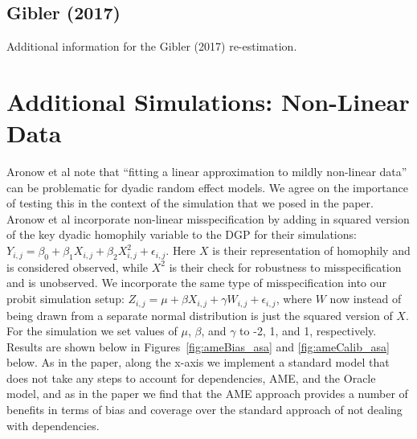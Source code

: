 \documentclass[12pt]{amsart}
\begin{document}
\subsection*{Gibler (2017)}

Additional information for the Gibler (2017) re-estimation.


\FloatBarrier

\FloatBarrier
\clearpage


\section{Additional Simulations: Non-Linear Data}

Aronow et al note that ``fitting a linear approximation to mildly non-linear data'' can be problematic for dyadic random effect models. We agree on the importance of testing this in the context of the simulation that we posed in the paper. Aronow et al incorporate non-linear misspecification by adding in squared version of the key dyadic homophily variable to the DGP for their simulations: $Y_{i,j} = \beta_{0} + \beta_{1} X_{i,j} + \beta_{2} X_{i,j}^{2} + \epsilon_{i,j}$. Here $X$ is their representation of homophily and is considered observed, while $X^{2}$ is their check for robustness to misspecification and is unobserved. We incorporate the same type of misspecification into our probit simulation setup: $Z_{i,j} =  \mu + \beta X_{i,j} + \gamma W_{i,j} + \epsilon_{i,j}$, where $W$ now instead of being drawn from a separate normal distribution is just the squared version of $X$. For the simulation we set values of $\mu$, $\beta$, and $\gamma$ to -2, 1, and 1, respectively. Results are shown below in Figures~\ref{fig:ameBias_asa} and \ref{fig:ameCalib_asa} below. As in the paper, along the x-axis we implement a standard model that does not take any steps to account for dependencies, AME, and the Oracle model, and as in the paper we find that the AME approach provides a number of benefits in terms of bias and coverage over the standard approach of not dealing with dependencies.
\end{document}
